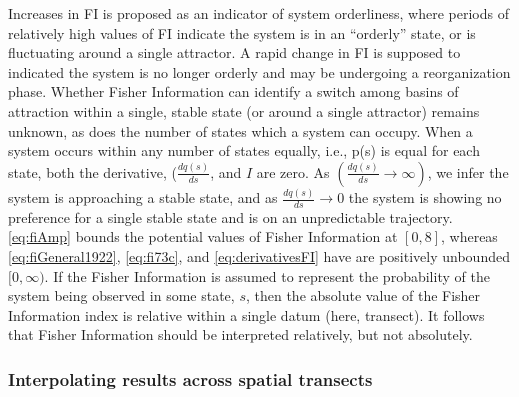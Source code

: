 \documentclass[12pt,twoside,openany]{reedthesis}
\begin{document}
Increases in FI is proposed as an indicator of system orderliness, where periods of relatively high values of FI indicate the system is in an ``orderly'' state, or is fluctuating around a single attractor. A rapid change in FI is supposed to indicated the system is no longer orderly and may be undergoing a reorganization phase. Whether Fisher Information can identify a switch among basins of attraction within a single, stable state (or around a single attractor) remains unknown, as does the number of states which a system can occupy. When a system occurs within any number of states equally, i.e., p(s) is equal for each state, both the derivative, (\(\frac{dq(s)}{ds}\), and \(I\) are zero. As \((\frac{dq(s)}{ds} \rightarrow \infty)\), we infer the system is approaching a stable state, and as \(\frac{dq(s)}{ds} \rightarrow 0\) the system is showing no preference for a single stable state and is on an unpredictable trajectory. \eqref{eq:fiAmp} bounds the potential values of Fisher Information at \([0, 8]\), whereas \eqref{eq:fiGeneral1922}, \eqref{eq:fi73c}, and \eqref{eq:derivativesFI} have are positively unbounded \([0, \infty)\). If the Fisher Information is assumed to represent the probability of the system being observed in some state, \(s\), then the absolute value of the Fisher Information index is relative within a single datum (here, transect). It follows that Fisher Information should be interpreted relatively, but not absolutely.

\hypertarget{interpolating-results-across-spatial-transects}{%
\subsubsection{Interpolating results across spatial transects}\label{interpolating-results-across-spatial-transects}}
\end{document}
